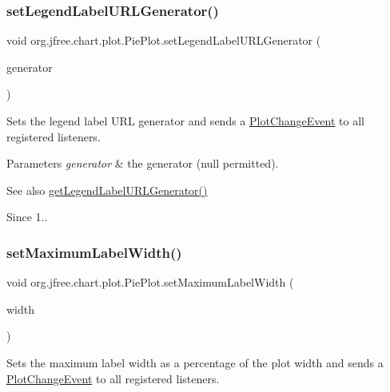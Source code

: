 \subsubsection{\texorpdfstring{set\+Legend\+Label\+U\+R\+L\+Generator()}{setLegendLabelURLGenerator()}}
{\footnotesize\ttfamily void org.\+jfree.\+chart.\+plot.\+Pie\+Plot.\+set\+Legend\+Label\+U\+R\+L\+Generator (\begin{DoxyParamCaption}\item[{\mbox{\hyperlink{interfaceorg_1_1jfree_1_1chart_1_1urls_1_1_pie_u_r_l_generator}{Pie\+U\+R\+L\+Generator}}}]{generator }\end{DoxyParamCaption})}

Sets the legend label U\+RL generator and sends a \mbox{\hyperlink{}{Plot\+Change\+Event}} to all registered listeners.


\begin{DoxyParams}{Parameters}
{\em generator} & the generator ({\ttfamily null} permitted).\\
\hline
\end{DoxyParams}
\begin{DoxySeeAlso}{See also}
\mbox{\hyperlink{classorg_1_1jfree_1_1chart_1_1plot_1_1_pie_plot_a504f2ae046fabdf07dcef72fc1c3d3a5}{get\+Legend\+Label\+U\+R\+L\+Generator()}}
\end{DoxySeeAlso}
\begin{DoxySince}{Since}
1.. 
\end{DoxySince}
\mbox{\label{classorg_1_1jfree_1_1chart_1_1plot_1_1_pie_plot_abf190f2dce528ec30e486a75e27c3f5e}} 
\subsubsection{\texorpdfstring{set\+Maximum\+Label\+Width()}{setMaximumLabelWidth()}}
{\footnotesize\ttfamily void org.\+jfree.\+chart.\+plot.\+Pie\+Plot.\+set\+Maximum\+Label\+Width (\begin{DoxyParamCaption}\item[{double}]{width }\end{DoxyParamCaption})}

Sets the maximum label width as a percentage of the plot width and sends a \mbox{\hyperlink{}{Plot\+Change\+Event}} to all registered listeners.


